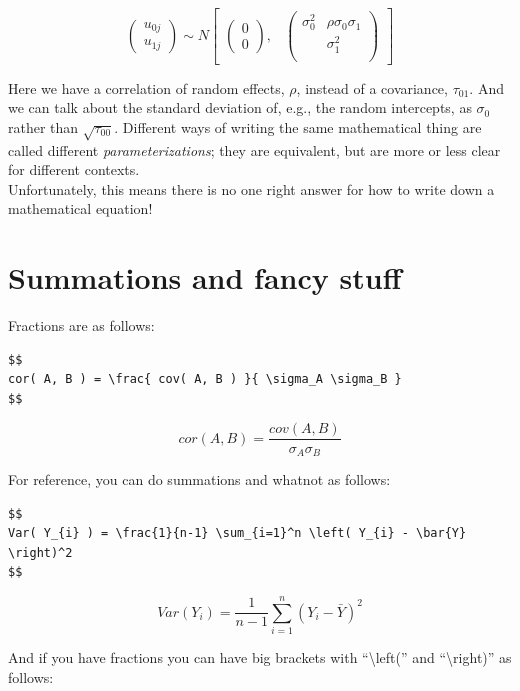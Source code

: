 \documentclass[
  letterpaper,
  DIV=11,
  numbers=noendperiod]{scrreprt}
\begin{document}
\[
\begin{pmatrix} u_{0j} \\
u_{1j}
\end{pmatrix} \sim  N
\begin{bmatrix}
\begin{pmatrix}
0 \\
0
\end{pmatrix}\!\!,&
\begin{pmatrix}
\sigma^2_{0} & \rho \sigma_0 \sigma_1 \\
 & \sigma^2_{1} \\
\end{pmatrix}
\end{bmatrix}
\]

Here we have a correlation of random effects, \(\rho\), instead of a
covariance, \(\tau_{01}\). And we can talk about the standard deviation
of, e.g., the random intercepts, as \(\sigma_0\) rather than
\(\sqrt{ \tau_{00} }\). Different ways of writing the same mathematical
thing are called different \emph{parameterizations}; they are
equivalent, but are more or less clear for different contexts.\\
Unfortunately, this means there is no one right answer for how to write
down a mathematical equation!

\hypertarget{summations-and-fancy-stuff}{%
\section{Summations and fancy stuff}\label{summations-and-fancy-stuff}}

Fractions are as follows:

\begin{verbatim}
$$
cor( A, B ) = \frac{ cov( A, B ) }{ \sigma_A \sigma_B }
$$
\end{verbatim}

\[
cor( A, B ) = \frac{ cov( A, B ) }{ \sigma_A \sigma_B }
\]

For reference, you can do summations and whatnot as follows:

\begin{verbatim}
$$
Var( Y_{i} ) = \frac{1}{n-1} \sum_{i=1}^n \left( Y_{i} - \bar{Y} \right)^2 
$$
\end{verbatim}

\[
Var( Y_{i} ) = \frac{1}{n-1} \sum_{i=1}^n \left( Y_{i} - \bar{Y} \right)^2 
\]

And if you have fractions you can have big brackets with
``\textbackslash left('' and ``\textbackslash right)'' as follows:
\end{document}
